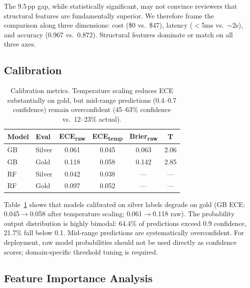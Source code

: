 \documentclass[11pt,a4paper]{article}
\begin{document}
The 9.5\,pp gap, while statistically significant, may not convince reviewers that structural features are fundamentally superior.
We therefore frame the comparison along three dimensions: cost (\$0 vs.\ \$47), latency ($<$5ms vs.\ $\sim$2s), and accuracy (0.967 vs.\ 0.872).
Structural features dominate or match on all three axes.

\subsection{Calibration}

\begin{table}[t]
\centering
\small
\begin{tabular}{llcccc}
\toprule
\textbf{Model} & \textbf{Eval} & \textbf{ECE\textsubscript{raw}} & \textbf{ECE\textsubscript{temp}} & \textbf{Brier\textsubscript{raw}} & \textbf{T} \\
\midrule
GB & Silver & 0.061 & 0.045 & 0.063 & 2.06 \\
GB & Gold & 0.118 & 0.058 & 0.142 & 2.85 \\
RF & Silver & 0.042 & 0.038 & --- & --- \\
RF & Gold & 0.097 & 0.052 & --- & --- \\
\bottomrule
\end{tabular}
\caption{Calibration metrics. Temperature scaling reduces ECE substantially on gold, but mid-range predictions (0.4--0.7 confidence) remain overconfident (45--63\% confidence vs.\ 12--23\% actual).}
\label{tab:calibration}
\end{table}

Table~\ref{tab:calibration} shows that models calibrated on silver labels degrade on gold (GB ECE: 0.045$\to$0.058 after temperature scaling; 0.061$\to$0.118 raw).
The probability output distribution is highly bimodal: 64.4\% of predictions exceed 0.9 confidence, 21.7\% fall below 0.1.
Mid-range predictions are systematically overconfident.
For deployment, raw model probabilities should not be used directly as confidence scores; domain-specific threshold tuning is required.

\subsection{Feature Importance Analysis}
\end{document}
